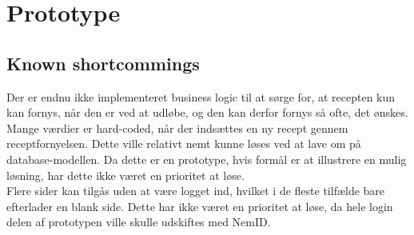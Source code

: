\section{Prototype}




\newpage
\subsection{Known shortcommings}
Der er endnu ikke implementeret business logic til at sørge for, at recepten kun kan fornys, når den er ved at udløbe, og den kan derfor fornys så ofte, det ønskes.\\
Mange værdier er hard-coded, når der indsættes en ny recept gennem receptfornyelsen. Dette ville relativt nemt kunne løses ved at lave om på database-modellen. Da dette er en prototype, hvis formål er at illustrere en mulig løsning, har dette ikke været en prioritet at løse.\\
Flere sider kan tilgås uden at være logget ind, hvilket i de fleste tilfælde bare efterlader en blank side. Dette har ikke været en prioritet at løse, da hele login delen af prototypen ville skulle udskiftes med NemID.
